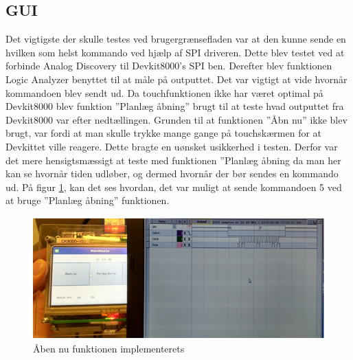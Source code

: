 \subsection{GUI}
Det vigtigste der skulle testes ved brugergrænsefladen var at den kunne sende en hvilken som helst kommando ved hjælp af SPI driveren. Dette blev testet ved at forbinde Analog Discovery til Devkit8000’s SPI ben. Derefter blev funktionen Logic Analyzer benyttet til at måle på outputtet. Det var vigtigt at vide hvornår kommandoen blev sendt ud. Da touchfunktionen ikke har været optimal på Devkit8000 blev funktion ”Planlæg åbning” brugt til at teste hvad outputtet fra Devkit8000 var efter nedtællingen. Grunden til at funktionen ”Åbn nu” ikke blev brugt, var fordi at man skulle trykke mange gange på touchskærmen for at Devkittet ville reagere. Dette bragte en uønsket usikkerhed i testen. Derfor var det mere hensigtsmæssigt at teste med funktionen ”Planlæg åbning da man her kan se hvornår tiden udløber, og dermed hvornår der bør sendes en kommando ud. På figur \ref{PAA}, kan det ses hvordan, det var muligt at sende kommandoen 5 ved at bruge ”Planlæg åbning” funktionen. 

\begin{figure}[H]
	\includegraphics[scale=1]{tex/Test/GUI-Test/Billeder/test_GUI}
	\caption{Åben nu funktionen implementerets}
	\label{PAA}
\end{figure}
